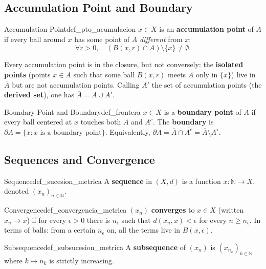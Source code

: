 \documentclass[11pt, a4paper]{article}
\begin{document}
\subsection{Accumulation Point and Boundary}

\begin{definicion}{Accumulation Point}{def_pto_acumulacion}
$x \in X$ is an \textbf{accumulation point} of $A$ if every ball around $x$ has some point
of $A$ \emph{different} from $x$:
$$ \forall r > 0, \quad (B(x, r) \cap A) \setminus \{x\} \ne \emptyset. $$
\end{definicion}

\obs Every accumulation point is in the closure, but not conversely: the
\textbf{isolated points} (points $x \in A$ such that some ball $B(x, r)$ meets $A$ only in
$\{x\}$) live in $\overline{A}$ but are not accumulation points. Calling $A'$ the set of accumulation
points (the \textbf{derived set}), one has $\overline{A} = A \cup A'$.

\begin{definicion}{Boundary Point and Boundary}{def_frontera}
$x \in X$ is a \textbf{boundary point} of $A$ if every ball centered at $x$ touches both $A$ and
$A^c$. The \textbf{boundary} is $\partial A = \{x : x \text{ is a boundary point}\}$. Equivalently,
$\partial A = \overline{A} \cap \overline{A^c} = \overline{A} \setminus A^\circ$.
\end{definicion}

\subsection{Sequences and Convergence}

\begin{definicion}{Sequence}{def_sucesion_metrica}
A \textbf{sequence} in $(X, d)$ is a function $x: \mathbb{N} \to X$, denoted
$(x_n)_{n \in \mathbb{N}}$.
\end{definicion}

\begin{definicion}{Convergence}{def_convergencia_metrica}
$(x_n)$ \textbf{converges} to $x \in X$ (written $x_n \to x$) if for every $\epsilon > 0$ there is
$n_\epsilon$ such that $d(x_n, x) < \epsilon$ for every $n \ge n_\epsilon$. In terms of balls: from
a certain $n_\epsilon$ on, all the terms live in $B(x, \epsilon)$.
\end{definicion}

\begin{definicion}{Subsequence}{def_subsucesion_metrica}
A \textbf{subsequence} of $(x_n)$ is $(x_{n_k})_{k \in \mathbb{N}}$ where $k \mapsto n_k$ is
strictly increasing.
\end{definicion}
\end{document}
